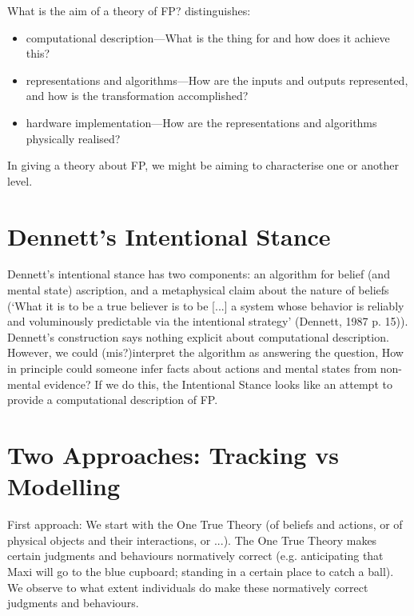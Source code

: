 \documentclass[12pt,\papersize]{extarticle}
\begin{document}
What is the aim of a theory of FP?
\citet[p.~22ff]{Marr:1982kx} distinguishes:

\begin{itemize}

\item computational description---What is the thing for and how does it achieve this?

\item representations and algorithms---How are the inputs and outputs represented, and how is the transformation accomplished?

\item hardware implementation---How are the representations and algorithms physically realised?

\end{itemize}
%
In giving a theory about FP, we might be aiming to characterise one or another level.



\section{Dennett’s Intentional Stance}
Dennett’s intentional stance has two components: an algorithm for belief (and mental state) ascription, and a metaphysical claim about the nature of beliefs (‘What it is to be a true believer is to be [...] a system whose behavior is reliably and voluminously predictable via the intentional strategy’ (Dennett, 1987 p. 15)).
Dennett’s construction says nothing explicit about computational description. 
However, we could (mis?)interpret the algorithm as answering the question, How in principle could someone infer facts about actions and mental states from non-mental evidence?  If we do this, the Intentional Stance looks like an attempt to provide a computational description of FP.



\section{Two Approaches: Tracking vs Modelling}

First approach: We start with the One True Theory (of beliefs and actions, or of physical objects and their interactions, or ...).  The One True Theory makes certain judgments and behaviours normatively correct (e.g. anticipating that Maxi will go to the blue cupboard; standing in a certain place to catch a ball).  We observe to what extent individuals do make these normatively correct judgments and behaviours.
\end{document}
